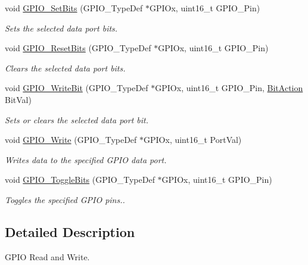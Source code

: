 \begin{DoxyCompactItemize}
void \mbox{\hyperlink{group___g_p_i_o___group2_ga9e1352eed7c6620e18af2d86f6b6ff8e}{G\+P\+I\+O\+\_\+\+Set\+Bits}} (G\+P\+I\+O\+\_\+\+Type\+Def $\ast$G\+P\+I\+Ox, uint16\+\_\+t G\+P\+I\+O\+\_\+\+Pin)
\begin{DoxyCompactList}\small\item\em Sets the selected data port bits. \end{DoxyCompactList}\item 
void \mbox{\hyperlink{group___g_p_i_o___group2_ga6fcd35b207a66608dd2c9d7de9247dc8}{G\+P\+I\+O\+\_\+\+Reset\+Bits}} (G\+P\+I\+O\+\_\+\+Type\+Def $\ast$G\+P\+I\+Ox, uint16\+\_\+t G\+P\+I\+O\+\_\+\+Pin)
\begin{DoxyCompactList}\small\item\em Clears the selected data port bits. \end{DoxyCompactList}\item 
void \mbox{\hyperlink{group___g_p_i_o___group2_ga8f7b237fd744d9f7456fbe0da47a9b80}{G\+P\+I\+O\+\_\+\+Write\+Bit}} (G\+P\+I\+O\+\_\+\+Type\+Def $\ast$G\+P\+I\+Ox, uint16\+\_\+t G\+P\+I\+O\+\_\+\+Pin, \mbox{\hyperlink{group___g_p_i_o_ga176130b21c0e719121470a6042d4cf19}{Bit\+Action}} Bit\+Val)
\begin{DoxyCompactList}\small\item\em Sets or clears the selected data port bit. \end{DoxyCompactList}\item 
void \mbox{\hyperlink{group___g_p_i_o___group2_gaa925f19c8547a00c7a0c269a84873bf9}{G\+P\+I\+O\+\_\+\+Write}} (G\+P\+I\+O\+\_\+\+Type\+Def $\ast$G\+P\+I\+Ox, uint16\+\_\+t Port\+Val)
\begin{DoxyCompactList}\small\item\em Writes data to the specified G\+P\+IO data port. \end{DoxyCompactList}\item 
void \mbox{\hyperlink{group___g_p_i_o___group2_gac1b837c66258872740d5f89f23549ab1}{G\+P\+I\+O\+\_\+\+Toggle\+Bits}} (G\+P\+I\+O\+\_\+\+Type\+Def $\ast$G\+P\+I\+Ox, uint16\+\_\+t G\+P\+I\+O\+\_\+\+Pin)
\begin{DoxyCompactList}\small\item\em Toggles the specified G\+P\+IO pins.. \end{DoxyCompactList}\end{DoxyCompactItemize}


\subsection{Detailed Description}
G\+P\+IO Read and Write. 

